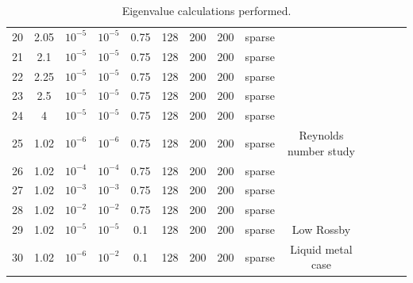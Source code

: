 \documentclass{rsproca_new}%
\begin{document}
\begin{table}
\begin{tabular}{cccccccccccccc}
20 & 2.05   & $10^{-5}$ & $10^{-5}$ & 0.75 & 128 & 200 & 200 & sparse & \\
21 & 2.1    & $10^{-5}$ & $10^{-5}$ & 0.75 & 128 & 200 & 200 & sparse & \\
22 & 2.25   & $10^{-5}$ & $10^{-5}$ & 0.75 & 128 & 200 & 200 & sparse & \\
23 & 2.5    & $10^{-5}$ & $10^{-5}$ & 0.75 & 128 & 200 & 200 & sparse & \\
24 & 4      & $10^{-5}$ & $10^{-5}$ & 0.75 & 128 & 200 & 200 & sparse & \\
25 & 1.02   & $10^{-6}$ & $10^{-6}$ & 0.75 & 128 & 200 & 200 & sparse & Reynolds number study\\
26 & 1.02   & $10^{-4}$ & $10^{-4}$ & 0.75 & 128 & 200 & 200 & sparse & \\
27 & 1.02   & $10^{-3}$ & $10^{-3}$ & 0.75 & 128 & 200 & 200 & sparse & \\
28 & 1.02   & $10^{-2}$ & $10^{-2}$ & 0.75 & 128 & 200 & 200 & sparse & \\
29 & 1.02   & $10^{-5}$ & $10^{-5}$ & 0.1  & 128 & 200 & 200 & sparse & Low Rossby\\ 
30 & 1.02   & $10^{-6}$ & $10^{-2}$ & 0.1  & 128 & 200 & 200 & sparse & Liquid metal case\\ 
\end{tabular}
\caption{Eigenvalue calculations performed.}
\label{tab:runs}
\end{table}
\end{document}
